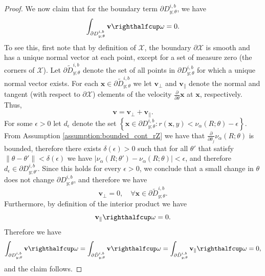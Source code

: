 \documentclass[letterpaper]{article}
\newcommand{\var}{\nu_\alpha}
\newcommand{\cX}{\mathcal{X}}
\newcommand{\bx}{\mathbf{x}}
\newcommand{\Dth}{\frac{\partial}{\partial \theta_j}}
\begin{document}
\begin{proof}
We now claim that for the boundary term $\partial D_{y;\theta}^{i,b}$, we have
\begin{equation}\label{eq:zero_velocity}
\int_{\partial D_{y;\theta}^{i,b}} \mathbf{v} \righthalfcup \omega = 0.
\end{equation}
To see this, first note that by definition of $\cX$, the boundary $\partial \cX$ is smooth and has a unique normal vector at each point, except for a set of measure zero (the corners of $\cX$). Let $\partial \tilde{D}_{y;\theta}^{i,b}$ denote the set of all points in $\partial D_{y;\theta}^{i,b}$ for which a unique normal vector exists. For each $\bx \in \partial \tilde{D}_{y;\theta}^{i,b}$ we let $\mathbf{v}_\perp$ and $\mathbf{v}_\parallel$ denote the normal and tangent (with respect to $\partial \cX$) elements of the velocity $\frac{\partial }{\partial \theta} \bx$ at $\bx$, respectively. Thus,
\begin{equation*}
\mathbf{v} = \mathbf{v}_\perp + \mathbf{v}_\parallel.
\end{equation*}
For some $\epsilon > 0$ let $d_\epsilon$ denote the set $\left\{ \bx \in \partial D_{y;\theta}^{i,b} : r(\bx,y) < \var (R;\theta) - \epsilon \right\}$. From Assumption \ref{assumption:bounded_cont_rZ} we have that $\Dth \var (R;\theta)$ is bounded, therefore there exists $\delta(\epsilon) > 0$ such that for all $\theta'$ that satisfy $\| \theta - \theta' \| < \delta(\epsilon)$ we have $\left|\var (R;\theta') - \var (R;\theta)\right| < \epsilon$, and therefore $d_\epsilon \in \partial D_{y;\theta'}^{i,b}$. Since this holds for every $\epsilon > 0$, we conclude that a small change in $\theta$ does not change $\partial D_{y;\theta}^{i,b}$, and therefore we have
\begin{equation*}
\mathbf{v}_\perp = 0, \quad \forall \bx \in \partial \tilde{D}_{y;\theta}^{i,b}.
\end{equation*}
Furthermore, by definition of the interior product we have
\begin{equation*}
\mathbf{v}_\parallel \righthalfcup \omega = 0.
\end{equation*}
Therefore we have
\begin{equation*}
\int_{\partial D_{y;\theta}^{i,b}} \mathbf{v} \righthalfcup \omega = \int_{\partial \tilde{D}_{y;\theta}^{i,b}} \mathbf{v} \righthalfcup \omega = \int_{\partial \tilde{D}_{y;\theta}^{i,b}} \mathbf{v}_\parallel \righthalfcup \omega = 0,
\end{equation*}
and the claim follows.


\end{proof}
\end{document}
